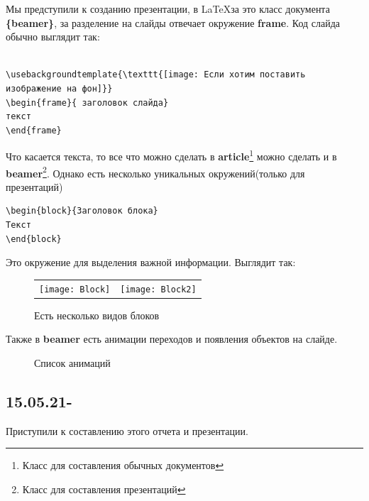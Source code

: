 \documentclass[14pt, a4paper]{extarticle}
\begin{document}
Мы предступили к созданию презентации, в \LaTeX за это класс документа \textbf{\{beamer\}}, за разделение на слайды отвечает окружение \textbf{frame}. Код слайда обычно выглядит так:
\begin{center}
\begin{verbatim}

\usebackgroundtemplate{\texttt{[image: Если хотим поставить изображение на фон]}}
\begin{frame}{ заголовок слайда}
текст
\end{frame}
\end{verbatim}
\end{center} 

Что касается текста, то все что можно сделать в \textbf{article}\footnote{Класс для составления обычных документов} можно сделать и в \textbf{beamer}\footnote{Класс для составления презентаций}. Однако есть несколько уникальных окружений(только для презентаций)
\begin{center}
\begin{verbatim}
\begin{block}{Заголовок блока}
Текст
\end{block} 
\end{verbatim}
\end{center}
Это окружение для выделения важной информации. Выглядит так:

\begin{figure}[h]
\begin{tabular}{cc}
\texttt{[image: Block]}
&
\texttt{[image: Block2]}
\end{tabular}
\caption{Есть несколько видов блоков}
\end{figure}

Также в \textbf{beamer} есть анимации переходов и появления объектов на слайде.
\begin{figure}[h!]
\setlength{\fboxsep}{0pt}%
\setlength{\fboxrule}{1pt}%
\fbox{\texttt{[image: Pr]}}%
\caption{Список анимаций}
\label{fig:image}
\end{figure}














\subsection{15.05.21-}
Приступили к составлению этого отчета и презентации.
\end{document}
